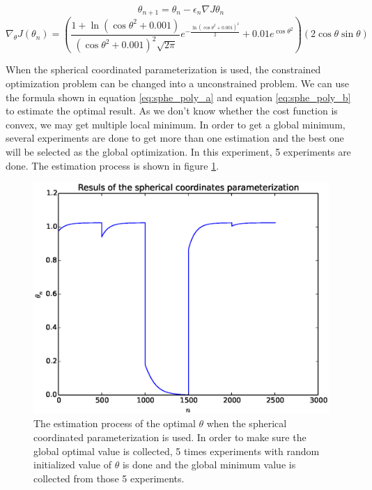 \documentclass[a4paper,12pt]{article}
\begin{document}
\begin{equation} \label{eq:sphe_poly_a}
\theta_{n+1}=\theta_n-\epsilon _n \nabla J{\theta_ n}
\end{equation}
\begin{equation}\label{eq:sphe_poly_b}
\nabla _{\theta} J(\theta_n) = (\frac{1+\ln( \cos \theta ^2+0.001)}{( \cos \theta ^2+0.001)^2 \sqrt{2 \pi}}e^{-\frac{\ln( \cos \theta ^2+0.001)^2}{2} }  +0.01 e^ {\cos \theta ^2})(2 \cos \theta \sin \theta)
\end{equation}

When the spherical coordinated parameterization is used, the constrained optimization problem can be changed into a unconstrained problem. We can use the formula shown in equation \ref{eq:sphe_poly_a} and equation \ref{eq:sphe_poly_b} to estimate the optimal result. As we don't know whether the cost function is convex, we may get multiple local minimum. In order to get a global minimum, several experiments are done to get more than one estimation and the best one will be selected as the global optimization. In this experiment, 5 experiments are done. The estimation process is  shown in figure \ref{fig:polynomial_est_res_sphe}.\\



\begin{figure}[H]
\begin{center}
\includegraphics[width=1.0\linewidth]{polynomial_est_sphe.eps}


\end{center}
   \caption{The estimation process of the optimal $\theta$ when the spherical coordinated parameterization is used. In order to make sure the global optimal value is collected, 5 times experiments with random initialized value of $\theta$ is done and the global minimum value is collected from those 5 experiments.}
\label{fig:polynomial_est_res_sphe}
\end{figure}
\end{document}
